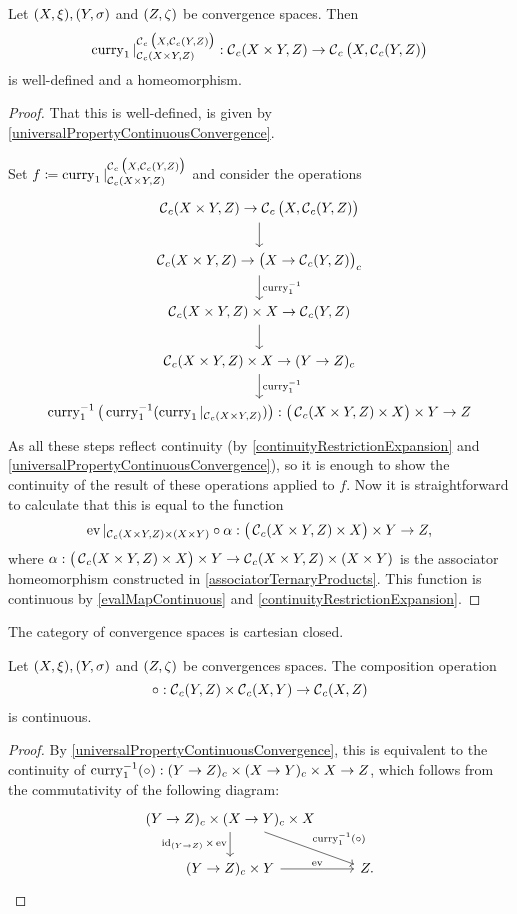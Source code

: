 \begin{proposition}
Let $\sSet{X, \xi}, \sSet{Y,\sigma}$ and $\sSet{Z,\zeta}$ be convergence spaces. Then
\[ \operatorname{curry}_1|_{\operatorname{\mathcal{C}}_c(X\times Y, Z)}^{\operatorname{\mathcal{C}}_c\big(X, \operatorname{\mathcal{C}}_c(Y,Z)\big)}: \operatorname{\mathcal{C}}_c(X\times Y, Z) \to \operatorname{\mathcal{C}}_c\big(X, \operatorname{\mathcal{C}}_c(Y,Z)\big) \]
is well-defined and a homeomorphism.
\end{proposition}
\begin{proof}
That this is well-defined, is given by \ref{universalPropertyContinuousConvergence}.

Set $f \coloneqq \operatorname{curry}_1|_{\operatorname{\mathcal{C}}_c(X\times Y, Z)}^{\operatorname{\mathcal{C}}_c\big(X, \operatorname{\mathcal{C}}_c(Y,Z)\big)}$ and consider the operations
\[ \begin{tikzcd}
\cont_c(X\times Y, Z) \to \cont_c\big(X, \cont_c(Y,Z)\big) \ar[d] \\
\cont_c(X\times Y, Z) \to \big(X \to \cont_c(Y,Z)\big)_c \ar[d, "{\curry_1^{-1}}"] \\
\cont_c(X\times Y, Z)\times X \to \cont_c(Y,Z) \ar[d] \\
\cont_c(X\times Y, Z)\times X \to (Y \to Z)_c \ar[d, "{\curry_1^{-1}}"] \\
\curry_1^{-1}\big(\curry_1^{-1}(\curry_1|_{\cont_c(X\times Y, Z)})\big): \big(\cont_c(X\times Y, Z)\times X\big)\times Y \to Z
\end{tikzcd} \]
As all these steps reflect continuity (by \ref{continuityRestrictionExpansion} and \ref{universalPropertyContinuousConvergence}), so it is enough to show the continuity of the result of these operations applied to $f$. Now it is straightforward to calculate that this is equal to the function
\[ \operatorname{ev}|_{\operatorname{\mathcal{C}}_c(X\times Y, Z)\times (X\times Y)}\circ \alpha: \big(\operatorname{\mathcal{C}}_c(X\times Y, Z)\times X\big)\times Y \to Z, \]
where $\alpha: \big(\operatorname{\mathcal{C}}_c(X\times Y, Z)\times X\big)\times Y \to \operatorname{\mathcal{C}}_c(X\times Y, Z)\times (X\times Y)$ is the associator homeomorphism constructed in \ref{associatorTernaryProducts}. This function is continuous by \ref{evalMapContinuous} and \ref{continuityRestrictionExpansion}.
\end{proof}
\begin{corollary}
The category of convergence spaces is cartesian closed.
\end{corollary}

\begin{proposition} \label{compositionContinuouslyContinuous}
Let $\sSet{X, \xi}, \sSet{Y,\sigma}$ and $\sSet{Z,\zeta}$ be convergences spaces. The composition operation
\[ \circ: \operatorname{\mathcal{C}}_c(Y,Z) \times \operatorname{\mathcal{C}}_c(X,Y) \to \operatorname{\mathcal{C}}_c(X,Z) \]
is continuous.
\end{proposition}
\begin{proof}
By \ref{universalPropertyContinuousConvergence}, this is equivalent to the continuity of $\operatorname{curry}_1^{-1}(\circ): (Y\to Z)_c \times (X\to Y)_c \times X \to Z$, which follows from the commutativity of the following diagram:
\[\begin{tikzcd}
(Y\to Z)_c \times (X\to Y)_c \times X \ar[d, swap, "\id_{(Y\to Z)}\times \evalMap"] \ar[dr, "\curry_1^{-1}(\circ)"] & \\
(Y\to Z)_c\times Y \ar[r, "\evalMap"] & Z.
\end{tikzcd} \]
\end{proof}

